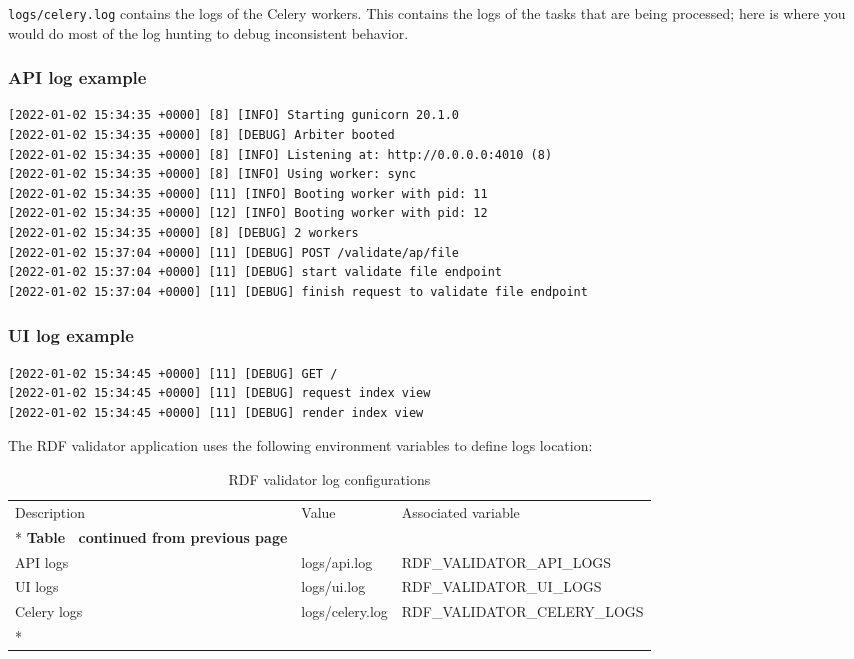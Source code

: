 \texttt{logs/celery.log} contains the logs of the Celery workers. This contains the logs of the tasks that are being processed; here is where you would do most of the log hunting to debug inconsistent behavior.

\subsubsection{API log example}
\begin{lstlisting}
[2022-01-02 15:34:35 +0000] [8] [INFO] Starting gunicorn 20.1.0
[2022-01-02 15:34:35 +0000] [8] [DEBUG] Arbiter booted
[2022-01-02 15:34:35 +0000] [8] [INFO] Listening at: http://0.0.0.0:4010 (8)
[2022-01-02 15:34:35 +0000] [8] [INFO] Using worker: sync
[2022-01-02 15:34:35 +0000] [11] [INFO] Booting worker with pid: 11
[2022-01-02 15:34:35 +0000] [12] [INFO] Booting worker with pid: 12
[2022-01-02 15:34:35 +0000] [8] [DEBUG] 2 workers
[2022-01-02 15:37:04 +0000] [11] [DEBUG] POST /validate/ap/file
[2022-01-02 15:37:04 +0000] [11] [DEBUG] start validate file endpoint
[2022-01-02 15:37:04 +0000] [11] [DEBUG] finish request to validate file endpoint
\end{lstlisting}

\subsubsection{UI log example}
\begin{lstlisting}
[2022-01-02 15:34:45 +0000] [11] [DEBUG] GET /
[2022-01-02 15:34:45 +0000] [11] [DEBUG] request index view
[2022-01-02 15:34:45 +0000] [11] [DEBUG] render index view
\end{lstlisting}

The RDF validator application uses the following environment variables to define logs location:

\begin{longtable}[c]{@{}p{3.5cm}p{3.5cm}l@{}}
	\toprule
	Description & Value           & Associated variable          \\* \midrule
	\endfirsthead
	\multicolumn{3}{c}%
	{{\bfseries Table \thetable\ continued from previous page}}  \\
	\endhead
	\bottomrule
	\endfoot
	\endlastfoot
	API logs    & logs/api.log    & RDF\_VALIDATOR\_API\_LOGS    \\
	UI logs     & logs/ui.log     & RDF\_VALIDATOR\_UI\_LOGS     \\
	Celery logs & logs/celery.log & RDF\_VALIDATOR\_CELERY\_LOGS \\* \bottomrule
	\caption{RDF validator log configurations}
	\label{tab:rdf-validator-log}                                \\
\end{longtable}
